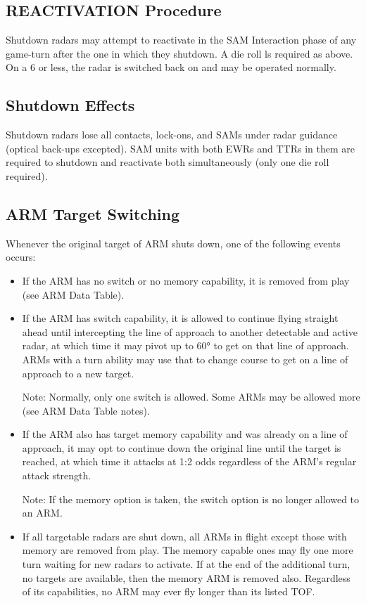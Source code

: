 \subsection{REACTIVATION Procedure} Shutdown radars may attempt to reactivate in the SAM Interaction phase of any game-turn after the one in which they shutdown. A die roll ls required as above. On a 6 or less, the radar is switched back on and may be operated normally.

\subsection{Shutdown Effects} Shutdown radars lose all contacts, lock-ons, and SAMs under radar guidance (optical back-ups excepted). SAM units with both EWRs and TTRs in them are required to shutdown and reactivate both simultaneously (only one die roll required).

\subsection{ARM Target Switching} Whenever the original target of ARM shuts down, one of the following events occurs:

\begin{itemize}

\item If the ARM has no switch or no memory capability, it is removed from play (see ARM Data Table).

\item If the ARM has switch capability, it is allowed to continue flying straight ahead until intercepting the line of approach to another detectable and active radar, at which time it may pivot up to 60° to get on that line of approach. ARMs with a turn ability may use that to change course to get on a line of approach to a new target.

Note: Normally, only one switch is allowed.  Some ARMs may be allowed more (see ARM Data Table notes).

\item If the ARM also has target memory capability and was already on a line of approach, it may opt to continue down the original line until the target is reached, at which time it attacks at 1:2 odds regardless of the ARM's regular attack strength.

Note: If the memory option is taken, the switch option is no longer allowed to an ARM.

\item If all targetable radars are shut down, all ARMs in flight except those with memory are removed from play. The memory capable ones may fly one more turn waiting for new radars to activate. If at the end of the additional turn, no targets are available, then the memory ARM is removed also. Regardless of its capabilities, no ARM may ever fly longer than its listed TOF.

\end{itemize}

